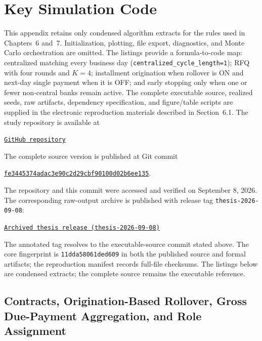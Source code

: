 \appendix
{}
{}

\chapter{Key Simulation Code}
\label{app:key-code}

This appendix retains only condensed algorithm extracts for the rules used
in Chapters~6 and~7. Initialization, plotting, file export, diagnostics, and
Monte Carlo orchestration are omitted. The listings provide a formula-to-code
map: centralized matching every
business day (\texttt{centralized\_cycle\_length=1}); RFQ with four rounds
and \(K=4\); installment origination when rollover is ON and next-day single
payment when it is OFF; and early stopping only when one or fewer
non-central banks remain active. The complete executable source, realized
seeds, raw artifacts, dependency specification, and figure/table scripts are
supplied in the electronic reproduction materials described in Section~6.1.
The study repository is available at
\begin{center}\small
\href{https://github.com/zhanghaoyu1232-debug/central-bank-simulation}{\texttt{GitHub repository}}
\end{center}
The complete source version is published at Git commit
\begin{center}\small
\href{https://github.com/zhanghaoyu1232-debug/central-bank-simulation/commit/fe3445374adac3e90c2d29cbf90100d02b6ee135}{\nolinkurl{fe3445374adac3e90c2d29cbf90100d02b6ee135}}.
\end{center}
The repository and this commit were accessed and verified on September 8,
2026.
The corresponding raw-output archive is published with release tag
\texttt{thesis-2026-09-08}:
\begin{center}\small
\href{https://github.com/zhanghaoyu1232-debug/central-bank-simulation/releases/tag/thesis-2026-09-08}{\texttt{Archived thesis release (thesis-2026-09-08)}}
\end{center}
The annotated tag resolves to the executable-source commit stated above.
The core fingerprint is \texttt{11dda58061ded609} in both the published source
and formal artifacts; the reproduction manifest records full-file
checksums. The listings below are condensed extracts; the complete
source remains the executable reference.

\section{Contracts, Origination-Based Rollover, Gross Due-Payment Aggregation, and Role Assignment}

